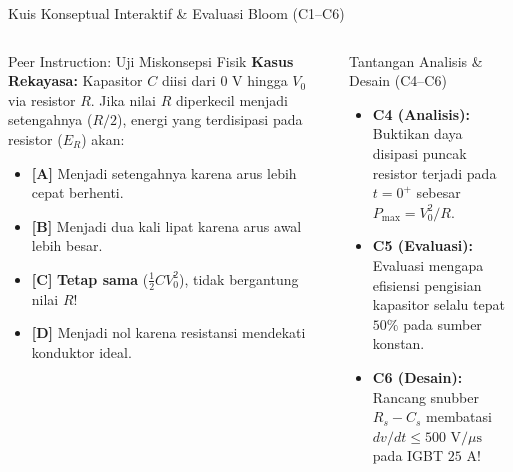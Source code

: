 \documentclass[aspectratio=169,10pt]{beamer}
\begin{document}
\begin{frame}{Kuis Konseptual Interaktif \& Evaluasi Bloom (C1--C6)}
  \begin{columns}[t]
    \begin{alertblock}{Peer Instruction: Uji Miskonsepsi Fisik}
      \footnotesize
      \textbf{Kasus Rekayasa:} Kapasitor $C$ diisi dari $0\text{ V}$ hingga $V_0$ via resistor $R$. Jika nilai $R$ diperkecil menjadi setengahnya ($R/2$), energi yang terdisipasi pada resistor ($E_R$) akan:
      \vspace{0.05cm}
      \begin{itemize}\setlength{\itemsep}{1pt}
        \item \textbf{[A]} Menjadi setengahnya karena arus lebih cepat berhenti.
        \item \textbf{[B]} Menjadi dua kali lipat karena arus awal lebih besar.
        \item \textbf{[C]} \textbf{Tetap sama} ($\frac{1}{2} C V_0^2$), tidak bergantung nilai $R$!
        \item \textbf{[D]} Menjadi nol karena resistansi mendekati konduktor ideal.
      \end{itemize}
    \end{alertblock}

    \begin{block}{Tantangan Analisis \& Desain (C4--C6)}
      \footnotesize
      \begin{itemize}\setlength{\itemsep}{2pt}
        \item \textbf{C4 (Analisis):} Buktikan daya disipasi puncak resistor terjadi pada $t=0^+$ sebesar $P_{\text{max}} = V_0^2/R$.
        \item \textbf{C5 (Evaluasi):} Evaluasi mengapa efisiensi pengisian kapasitor selalu tepat $50\%$ pada sumber konstan.
        \item \textbf{C6 (Desain):} Rancang snubber $R_s - C_s$ membatasi $dv/dt \le 500\text{ V}/\mu\text{s}$ pada IGBT $25\text{ A}$!
      \end{itemize}
    \end{block}
  \end{columns}
\end{frame}
\end{document}
